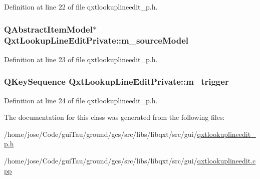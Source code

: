 Definition at line 22 of file qxtlookuplineedit\-\_\-p.\-h.

\hypertarget{class_qxt_lookup_line_edit_private_a961eb3ea17900ef545424264d8532963}{
\subsubsection[{m\-\_\-source\-Model}]{\setlength{\rightskip}{0pt plus 5cm}Q\-Abstract\-Item\-Model$\ast$ Qxt\-Lookup\-Line\-Edit\-Private\-::m\-\_\-source\-Model}}\label{class_qxt_lookup_line_edit_private_a961eb3ea17900ef545424264d8532963}


Definition at line 23 of file qxtlookuplineedit\-\_\-p.\-h.

\hypertarget{class_qxt_lookup_line_edit_private_a1b2e6e8551cc07c084efad80dda23ad7}{
\subsubsection[{m\-\_\-trigger}]{\setlength{\rightskip}{0pt plus 5cm}Q\-Key\-Sequence Qxt\-Lookup\-Line\-Edit\-Private\-::m\-\_\-trigger}}\label{class_qxt_lookup_line_edit_private_a1b2e6e8551cc07c084efad80dda23ad7}


Definition at line 24 of file qxtlookuplineedit\-\_\-p.\-h.



The documentation for this class was generated from the following files\-:\begin{DoxyCompactItemize}
\item 
/home/jose/\-Code/gui\-Tau/ground/gcs/src/libs/libqxt/src/gui/\hyperlink{qxtlookuplineedit__p_8h}{qxtlookuplineedit\-\_\-p.\-h}\item 
/home/jose/\-Code/gui\-Tau/ground/gcs/src/libs/libqxt/src/gui/\hyperlink{qxtlookuplineedit_8cpp}{qxtlookuplineedit.\-cpp}\end{DoxyCompactItemize}
